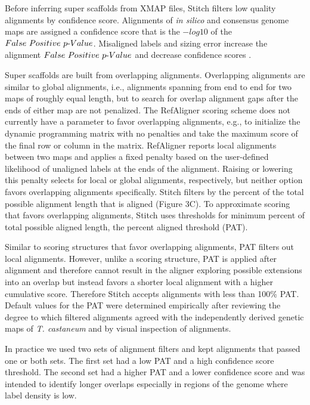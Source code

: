 \documentclass{bmcart}
\begin{document}
Before inferring super scaffolds from XMAP files, Stitch filters low quality alignments by confidence score. Alignments of \textit{in silico} and consensus genome maps are assigned a confidence score that is the $-log10$ of the $False\textnormal{ }Positive\textnormal{ }p\textnormal{-}Value$. Misaligned labels and sizing error increase the alignment $False\textnormal{ }Positive\textnormal{ }p\textnormal{-}Value$ and decrease confidence scores \cite{ProbFP}.

Super scaffolds are built from overlapping alignments. Overlapping alignments are similar to global alignments, i.e., alignments spanning from end to end for two maps of roughly equal length, but to search for overlap alignment gaps after the ends of either map are not penalized. The RefAligner scoring scheme does not currently have a parameter to favor overlapping alignments, e.g., to initialize the dynamic programming matrix with no penalties and take the maximum score of the final row or column in the matrix. RefAligner reports local alignments between two maps and applies a fixed penalty based on the user-defined likelihood of unaligned labels at the ends of the alignment. Raising or lowering this penalty selects for local or global alignments, respectively, but neither option favors overlapping alignments specifically. Stitch filters by the percent of the total possible alignment length that is aligned (Figure 3C). To approximate scoring that favors overlapping alignments, Stitch uses thresholds for minimum percent of total possible aligned length, the percent aligned threshold (PAT). 

Similar to scoring structures that favor overlapping alignments, PAT filters out local alignments. However, unlike a scoring structure, PAT is applied after alignment and therefore cannot result in the aligner exploring possible extensions into an overlap but instead favors a shorter local alignment with a higher cumulative score. Therefore Stitch accepts alignments with less than 100\% PAT. Default values for the PAT were determined empirically after reviewing the degree to which filtered alignments agreed with the independently derived genetic maps of \textit{T. castaneum} and by visual inspection of alignments.

In practice we used two sets of alignment filters and kept alignments that passed one or both sets. The first set had a low PAT and a high confidence score threshold. The second set had a higher PAT and a lower confidence score and was intended to identify longer overlaps especially in regions of the genome where label density is low.
\end{document}

